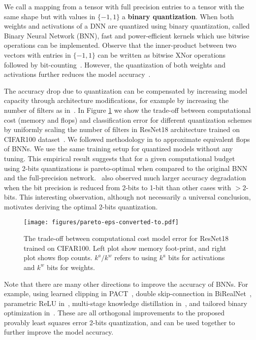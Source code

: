 \documentclass[10pt,twocolumn,letterpaper]{article}
\begin{document}
We call a mapping from a tensor with full precision entries to a tensor with the same shape but with values in $\{-1, 1\}$ a {\bf binary quantization}. When both weights and activations of a DNN are quantized using binary quantization, called Binary Neural Network (BNN), fast and power-efficient kernels which use bitwise operations can be implemented. Observe that the inner-product between two vectors with entries in $\{-1, 1\}$ can be written as bitwise XNor operations followed by bit-counting~\cite{courbariaux2016binarized}. However, the quantization of both weights and activations further reduces the model accuracy~\cite{hubara2017quantized,rastegari2016xnor}.

The accuracy drop due to quantization can be compensated by increasing model capacity through architecture modifications, for example by increasing the number of filters as in~\cite{zagoruyko2016wide}. In Figure \ref{fig:pareto} we show the trade-off between computational cost (memory and flops) and classification error for different quantization schemes by uniformly scaling the number of filters in ResNet18 architecture trained on CIFAR100 dataset~\cite{krizhevsky2009learning}. We followed methodology in \cite{wang2019learning} to approximate equivalent flops of BNNs. We use the same training setup for quantized models without any tuning. This empirical result suggests that for a given computational budget using 2-bits quantizations is pareto-optimal when compared to the original BNN and the full-precision network. \cite{Kim2020BinaryDuo}~also observed much larger accuracy degradation when the bit precision is reduced from 2-bits to 1-bit than other cases with $>\!2$-bits. This interesting observation, although not necessarily a universal conclusion, motivates deriving the optimal 2-bits quantization.

\begin{figure}[htb!]
\begin{center}
\texttt{[image: figures/pareto-eps-converted-to.pdf]}
\end{center}
\caption{The trade-off between computational cost model error for ResNet18 trained on CIFAR100. Left plot show memory foot-print, and right plot shows flop counts. $k^a/k^w$ refers to using $k^a$ bits for activations and $k^w$ bits for weights.}
\label{fig:pareto}
\end{figure}

Note that there are many other directions to improve the accuracy of BNNs. For example, using learned clipping in PACT~\cite{choi2018pact}, double skip-connection in BiRealNet~\cite{liu2018bi}, parametric ReLU in~\cite{bulat2019improved}, multi-stage knowledge distillation in~\cite{bagherinezhad2018label,bulat2019improved}, and tailored binary optimization in~\cite{helwegen2019latent}. These are all orthogonal improvements to the proposed provably least squares error 2-bits quantization, and can be used together to further improve the model accuracy.
\end{document}
